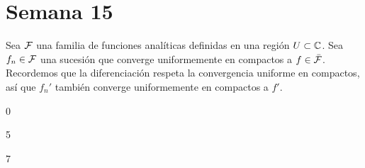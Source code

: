 \chapter*{Semana 15}

\begin{preliminaries}
Sea $\mathcal F$ una familia de funciones analíticas definidas en una región $U \subset \mathbb C$. Sea $f_n \in \mathcal F$ una sucesión que converge uniformemente en compactos a $f \in \bar {\mathcal F}$. Recordemos que la diferenciación respeta la convergencia uniforme en compactos, así que $f_n'$ también converge uniformemente en compactos a $f'$.
\end{preliminaries}

\setcounter{exercise} 0



\setcounter{exercise} 5



\setcounter{exercise} 7




